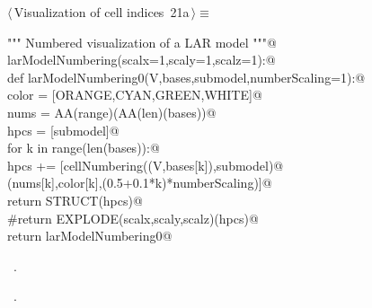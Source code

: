 \documentclass[11pt,oneside]{article}    %
\begin{document}
\begin{flushleft} \small \label{scrap33}
\protect{}$\langle\,$Visualization of cell indices\nobreak\ {\footnotesize 21a}$\,\rangle\equiv$
\vspace{-1ex}
\begin{list}{}{} \item
\mbox{}\verb@""" Numbered visualization of a LAR model """@\\
\mbox{}\verb@def larModelNumbering(scalx=1,scaly=1,scalz=1):@\\
\mbox{}\verb@    def  larModelNumbering0(V,bases,submodel,numberScaling=1):@\\
\mbox{}\verb@        color = [ORANGE,CYAN,GREEN,WHITE]@\\
\mbox{}\verb@        nums = AA(range)(AA(len)(bases))@\\
\mbox{}\verb@        hpcs = [submodel]@\\
\mbox{}\verb@        for k in range(len(bases)):@\\
\mbox{}\verb@            hpcs += [cellNumbering((V,bases[k]),submodel)@\\
\mbox{}\verb@                        (nums[k],color[k],(0.5+0.1*k)*numberScaling)]@\\
\mbox{}\verb@        return STRUCT(hpcs)@\\
\mbox{}\verb@        #return EXPLODE(scalx,scaly,scalz)(hpcs)@\\
\mbox{}\verb@    return larModelNumbering0@\\
\mbox{}\verb@@{\NWsep}
\end{list}
\vspace{-1ex}
\footnotesize\addtolength{\baselineskip}{-1ex}
\begin{list}{}{\setlength{\itemsep}{-\parsep}\setlength{\itemindent}{-\leftmargin}}
\item \NWtxtMacroDefBy\ .
\item \NWtxtMacroRefIn\ .
\end{list}
\end{flushleft}
\end{document}
